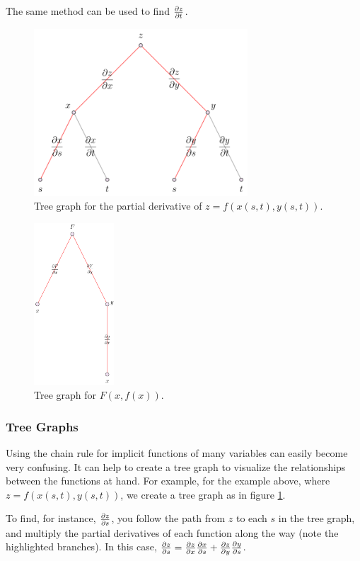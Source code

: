 \documentclass[12pt]{article}
\begin{document}
The same method can be used to find $\frac{\partial z}{\partial t}$.

\begin{figure}[!ht]
    \centering
    \includegraphics[width=8.0cm]{misc/partialderivativetreegraph.png}
    \caption{Tree graph for the partial derivative of $z = f(x(s,t),y(s,t))$.}
    \label{fig:partialderivativetreegraph}
\end{figure}


\begin{figure}[!ht]
    \centering
    \includegraphics[width=3.0cm]{misc/pdtreeimplicity.png}
    \caption{Tree graph for $F(x,f(x))$.}
    \label{fig:pdtreeimplicit}
\end{figure}

\subsubsection{Tree Graphs}

Using the chain rule for implicit functions of many variables can easily become very confusing. It can help to create a tree graph to visualize the relationships between the functions at hand. For example, for the example above, where $z = f(x(s,t),y(s,t))$, we create a tree graph as in figure \ref{fig:partialderivativetreegraph}.


To find, for instance, $\frac{\partial z}{\partial s}$, you follow the path from $z$ to each $s$ in the tree graph, and multiply the partial derivatives of each function along the way (note the highlighted branches). In this case, $\frac{\partial z}{\partial s} = \frac{\partial z}{\partial x} \frac{\partial x}{\partial s} + \frac{\partial z}{\partial y} \frac{\partial y}{\partial s}$.
\end{document}
